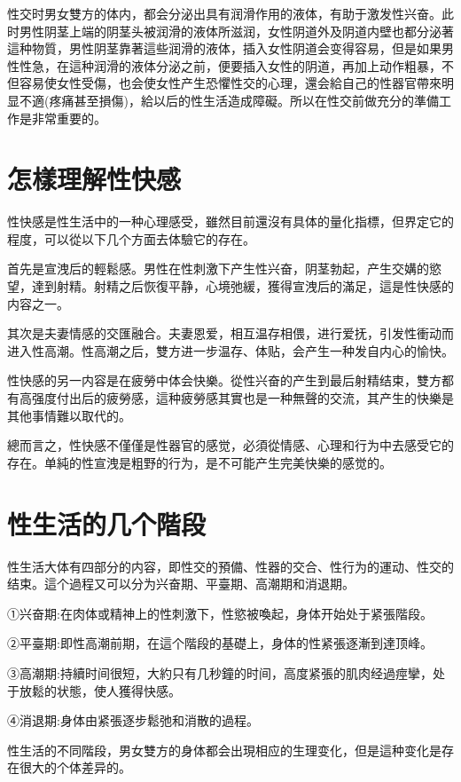\documentclass[12pt,UTF8]{ctexbook}
\begin{document}
性交时男女雙方的体内，都会分泌出具有润滑作用的液体，有助于激发性兴奋。此时男性阴茎上端的阴茎头被润滑的液体所滋润，女性阴道外及阴道内壁也都分泌著這种物質，男性阴茎靠著這些润滑的液体，插入女性阴道会变得容易，但是如果男性性急，在這种润滑的液体分泌之前，便要插入女性的阴道，再加上动作粗暴，不但容易使女性受傷，也会使女性产生恐懼性交的心理，還会給自己的性器官帶來明显不適(疼痛甚至損傷)，給以后的性生活造成障礙。所以在性交前做充分的準備工作是非常重要的。

\section{怎樣理解性快感}

性快感是性生活中的一种心理感受，雖然目前還沒有具体的量化指標，但界定它的程度，可以從以下几个方面去体驗它的存在。

首先是宣洩后的輕鬆感。男性在性刺激下产生性兴奋，阴茎勃起，产生交媾的慾望，達到射精。射精之后恢復平静，心境弛緩，獲得宣洩后的滿足，這是性快感的内容之一。

其次是夫妻情感的交匯融合。夫妻恩爱，相互温存相偎，进行爱抚，引发性衝动而进入性高潮。性高潮之后，雙方进一步温存、体贴，会产生一种发自内心的愉快。

性快感的另一内容是在疲勞中体会快樂。從性兴奋的产生到最后射精结束，雙方都有高强度付出后的疲勞感，這种疲勞感其實也是一种無聲的交流，其产生的快樂是其他事情難以取代的。

總而言之，性快感不僅僅是性器官的感觉，必須從情感、心理和行为中去感受它的存在。单純的性宣洩是粗野的行为，是不可能产生完美快樂的感觉的。

\section{性生活的几个階段}

性生活大体有四部分的内容，即性交的預備、性器的交合、性行为的運动、性交的结束。這个過程又可以分为兴奋期、平臺期、高潮期和消退期。

①兴奋期:在肉体或精神上的性刺激下，性慾被喚起，身体开始处于紧張階段。

②平臺期:即性高潮前期，在這个階段的基礎上，身体的性紧張逐漸到達顶峰。

③高潮期:持續时间很短，大約只有几秒鐘的时间，高度紧張的肌肉经過痙攣，处于放鬆的状態，使人獲得快感。

④消退期:身体由紧張逐步鬆弛和消散的過程。

性生活的不同階段，男女雙方的身体都会出現相应的生理变化，但是這种变化是存在很大的个体差异的。
\end{document}
